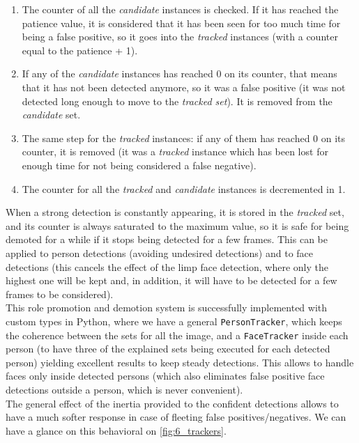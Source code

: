 	\begin{enumerate}
		\item The counter of all the \emph{candidate} instances is checked. If it has reached the patience value, it is considered that it has been seen for too much time for being a false positive, so it goes into the \emph{tracked} instances (with a counter equal to the patience + 1).
		
		\item If any of the \emph{candidate} instances has reached 0 on its counter, that means that it has not been detected anymore, so it was a false positive (it was not detected long enough to move to the \emph{tracked set}). It is removed from the \emph{candidate} set.
		
		\item The same step for the \emph{tracked} instances: if any of them has reached 0 on its counter, it is removed (it was a \emph{tracked} instance which has been lost for enough time for not being considered a false negative).
		
		\item The counter for all the \emph{tracked} and \emph{candidate} instances is decremented in 1.
	\end{enumerate}
	When a strong detection is constantly appearing, it is stored in the \emph{tracked} set, and its counter is always saturated to the maximum value, so it is safe for being demoted for a while if it stops being detected for a few frames. This can be applied to person detections (avoiding undesired detections) and to face detections (this cancels the effect of the limp face detection, where only the highest one will be kept and, in addition, it will have to be detected for a few frames to be considered).\\
	
	This role promotion and demotion system is successfully implemented with custom types in Python, where we have a general \texttt{PersonTracker}, which keeps the coherence between the sets for all the image, and a \texttt{FaceTracker} inside each person (to have three of the explained sets being executed for each detected person) yielding excellent results to keep steady detections. This allows to handle faces only inside detected persons (which also eliminates false positive face detections outside a person, which is never convenient).\\
	
	The general effect of the inertia provided to the confident detections allows to have a much softer response in case of fleeting false positives/negatives. We can have a glance on this behavioral on \autoref{fig:6_trackers}.
	
